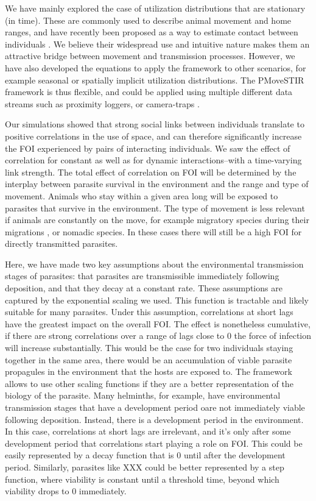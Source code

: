 \documentclass[letterpaper]{article}
\begin{document}
We have mainly explored the case of utilization distributions that are stationary (in time). These are commonly used to describe animal movement and home ranges, and have recently been proposed as a way to estimate contact between individuals \citep{Noonan2021}. 
We believe their widespread use and intuitive nature makes them an attractive bridge between movement and transmission processes. 
However, we have also developed the equations to apply the framework to other scenarios, for example seasonal or spatially implicit utilization distributions. 
The PMoveSTIR framework is thus flexible, and could be applied using multiple different data streams such as proximity loggers, or camera-traps \citep{Wilber2022}.

Our simulations showed that strong social links between individuals translate to positive correlations in the use of space, and can therefore significantly increase the FOI experienced by pairs of interacting individuals. 
We saw the effect of correlation for constant as well as for dynamic interactions--with a time-varying link strength. 
The total effect of correlation on FOI will be determined by the interplay between parasite survival in the environment and the range and type of movement. 
Animals who stay within a given area long will be exposed to parasites that survive in the environment. The type of movement is less relevant if animals are constantly on the move, for example migratory species during their migrations \citep{Peacock2018}, or nomadic species. In these cases there will still be a high FOI for directly transmitted parasites.



Here, we have made two key assumptions about the environmental transmission stages of parasites: that parasites are transmissible immediately following deposition, and that they decay at a constant rate. 
These assumptions are captured by the exponential scaling we used. This function is tractable and likely suitable for many parasites. Under this assumption, correlations at short lags have the greatest impact on the overall FOI. The effect is nonetheless cumulative, if there are strong correlations over a range of lags close to 0 the force of infection will increase substantially. This would be the case for two individuals staying together in the same area, there would be an accumulation of viable parasite propagules in the environment that the hosts are exposed to. 
The framework allows to use other scaling functions if they are a better representation of the biology of the parasite. 
Many helminths, for example, have environmental transmission stages that have a development period oare not immediately viable following deposition. Instead, there is a development period in the environment. In this case, correlations at short lags are irrelevant, and it's only after some development period that correlations start playing a role on FOI. This could be easily represented by a decay function that is 0 until after the development period. Similarly, parasites like XXX could be better represented by a step function, where viability is constant until a threshold time, beyond which viability drops to 0 immediately. 
\end{document}
